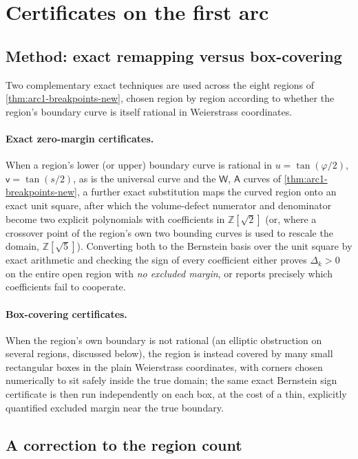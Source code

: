 \documentclass[11pt,reqno]{amsart}
\renewcommand{\_}{\origunderscore\allowbreak}
\numberwithin{equation}{section}
\theoremstyle{plain}
\theoremstyle{definition}
\theoremstyle{remark}
\newcommand{\tilt}{\varphi}                  %
\newcommand{\arcp}{s}                        %
\newcommand{\defect}{\Delta}                 %
\newcommand{\base}{u}                        %
\begin{document}
\section{Certificates on the first arc}\label{sec:arc1-cert}

\subsection{Method: exact remapping versus box-covering}\label{sec:method-overview-new}

Two complementary exact techniques are used across the eight regions of
\cref{thm:arc1-breakpoints-new}, chosen region by region according to
whether the region's boundary curve is itself rational in Weierstrass
coordinates.

\paragraph{Exact zero-margin certificates.} When a region's lower (or
upper) boundary curve is rational in $\base=\tan(\tilt/2)$,
$\mathsf v=\tan(\arcp/2)$, as is the universal curve and the
$\mathsf W$, $\mathsf A$ curves of \cref{thm:arc1-breakpoints-new}, a
further exact substitution maps the curved region onto an exact unit
square, after which the volume-defect numerator and denominator become
two explicit polynomials with coefficients in $\mathbb{Z}[\sqrt2]$ (or,
where a crossover point of the region's own two bounding curves is used
to rescale the domain, $\mathbb{Z}[\sqrt5]$). Converting both to the
Bernstein basis over the unit square by exact arithmetic and checking
the sign of every coefficient either proves $\defect_k>0$ on the entire
open region with \emph{no excluded margin}, or reports precisely which
coefficients fail to cooperate.

\paragraph{Box-covering certificates.} When the region's own boundary is
not rational (an elliptic obstruction on several regions,
discussed below), the region is instead covered by many small
rectangular boxes in the plain Weierstrass coordinates, with corners
chosen numerically to sit safely inside the true domain; the same exact
Bernstein sign certificate is then run independently on each box, at the
cost of a thin, explicitly quantified excluded margin near the true
boundary.

\subsection{A correction to the region count}\label{sec:region-count-correction}
\end{document}
